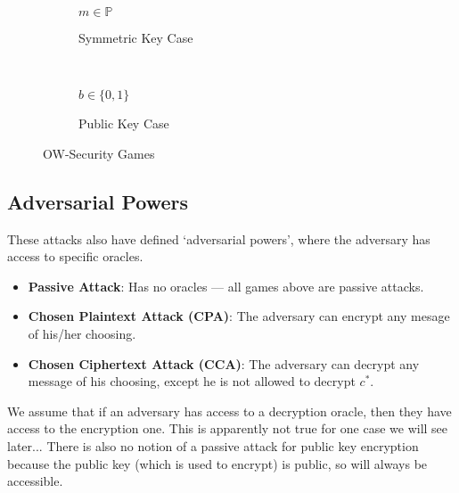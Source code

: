 \begin{figure}[htp!]
    \centering
    \begin{subfigure}[b]{0.4\textwidth}
        \centering
        \begin{cryptogame}{$m\in \mathbb{P}$}
        \end{cryptogame}
        \caption{Symmetric Key  Case}
        \label{fig:ow-sec-sym}
    \end{subfigure}
    ~
    \begin{subfigure}[b]{0.4\textwidth}
        \centering
        \begin{cryptogame}{$b\in \{0,1\}$}
        \end{cryptogame}
        \caption{Public Key Case}
        \label{fig:ow-sec-pub}
    \end{subfigure}
    \caption{OW-Security Games}
    \label{fig:ow-sec}
\end{figure}

\subsection{Adversarial Powers}
These attacks also have defined `adversarial powers', where the adversary has access to specific oracles.
\begin{itemize}
    \item \textbf{Passive Attack}: Has no oracles --- all games above are passive attacks.
    \item \textbf{Chosen Plaintext Attack (CPA)}: The adversary can encrypt any mesage of his/her choosing.
    \item \textbf{Chosen Ciphertext Attack (CCA)}: The adversary can decrypt any message of his choosing, except he is not allowed to decrypt $c^*$.
\end{itemize}
We assume that if an adversary has access to a decryption oracle, then they have access to the encryption one. This is apparently not true for one case we will see later... There is also no notion of a passive attack for public key encryption because the public key (which is used to encrypt) is public, so will always be accessible.


